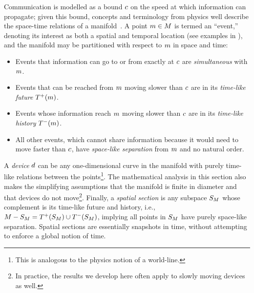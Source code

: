 \documentclass[12pt,a4paper,twoside,openright]{book}
\begin{document}
Communication is modelled as a bound $c$ on the speed at which information can propagate; given this bound, concepts and terminology from physics well describe the space-time relations of a manifold~\cite{RelativityIntroduction}.
%
A point $m \in M$ is termed an ``event,'' denoting its interest as both a spatial and temporal location (see examples in ), and the manifold may be partitioned with respect to $m$ in space and time:
\begin{itemize}
\item Events that information can go to or from exactly at $c$ are {\em simultaneous} with $m$.
\item Events that can be reached from $m$ moving slower than $c$ are in its {\em time-like future} $T^+({m})$.
\item Events whose information reach $m$ moving slower than $c$ are in its {\em time-like history} $T^-({m})$.
\item All other events, which cannot share information because it would need to move faster than $c$, have {\em space-like separation} from $m$ and no natural order.
\end{itemize}

A {\em device} $d$ can be any one-dimensional curve in the manifold with purely time-like relations between the points\footnote{This is analogous to the physics notion of a world-line.}.
%
The mathematical analysis in this section also makes the simplifying assumptions that the manifold is finite in diameter and that devices do not move\footnote{In practice, the results we develop here often apply to slowly moving devices as well.}.
%
Finally, a {\em spatial section} is any subspace $S_{M}$ whose complement is its time-like future and history, i.e., $M-S_{M} = T^+({S_{M}}) \cup T^-({S_{M}})$, implying all points in $S_{M}$ have purely space-like separation.  
%
Spatial sections are essentially snapshots in time, without attempting to enforce a global notion of time.
\end{document}
